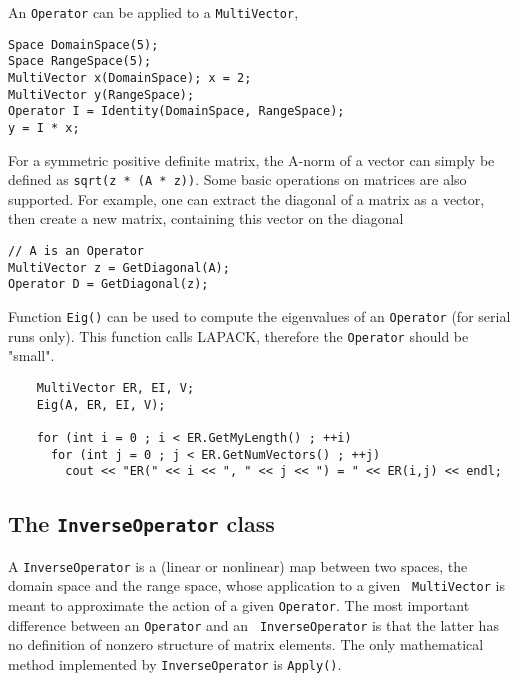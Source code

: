\documentclass{article}[11pt]
\begin{document}
An {\tt Operator} can be applied to a {\tt MultiVector},
\begin{verbatim}
Space DomainSpace(5);
Space RangeSpace(5);
MultiVector x(DomainSpace); x = 2;
MultiVector y(RangeSpace);
Operator I = Identity(DomainSpace, RangeSpace);
y = I * x;
\end{verbatim}

\smallskip

For a symmetric positive definite matrix, the A-norm of a vector can simply be
defined as \verb!sqrt(z * (A * z))!.
Some basic operations on matrices are also supported. For example,
one can extract the diagonal of a matrix as a vector, then create a new
matrix, containing this vector on the diagonal
\begin{verbatim}    
// A is an Operator
MultiVector z = GetDiagonal(A);
Operator D = GetDiagonal(z);
\end{verbatim}

Function {\tt Eig()} can be used to compute the eigenvalues of an
{\tt Operator}
(for serial runs only). This function calls LAPACK, therefore the
{\tt Operator} should be "small".
\begin{verbatim}    
    MultiVector ER, EI, V;
    Eig(A, ER, EI, V);

    for (int i = 0 ; i < ER.GetMyLength() ; ++i)
      for (int j = 0 ; j < ER.GetNumVectors() ; ++j)
        cout << "ER(" << i << ", " << j << ") = " << ER(i,j) << endl;
\end{verbatim}

\subsection{The {\tt InverseOperator} class}
\label{sec:inverseoperator}

A {\tt InverseOperator} is a (linear or nonlinear) map between two spaces, the
domain space and the range space, whose application to a given {\tt
  MultiVector} is meant to approximate the action of a given {\tt Operator}.
The most important difference between an {\tt Operator} and an {\tt
  InverseOperator} is that the latter has no definition of nonzero
  structure of matrix elements. The only mathematical method implemented
  by {\tt InverseOperator} is {\tt Apply()}.
\end{document}
